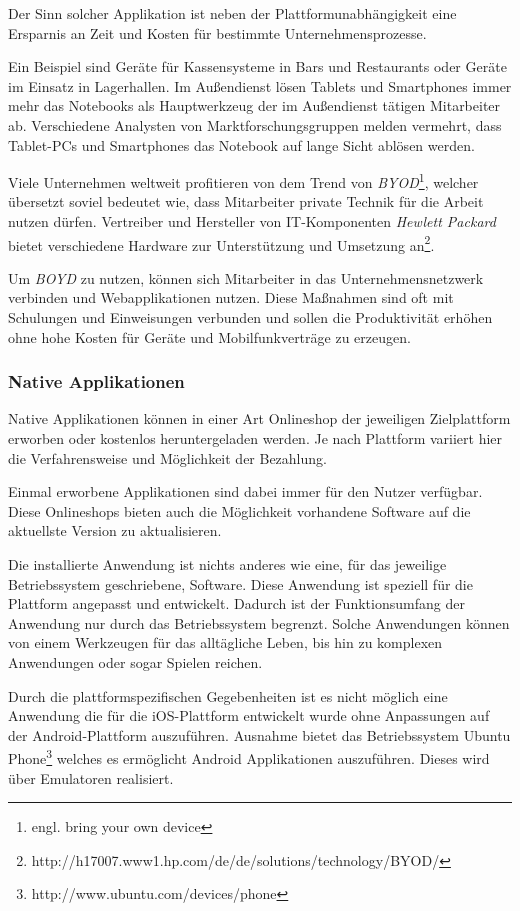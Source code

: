 Der Sinn solcher Applikation ist neben der Plattformunabhängigkeit eine Ersparnis an Zeit und Kosten für bestimmte Unternehmensprozesse.

Ein Beispiel sind Geräte für Kassensysteme in Bars und Restaurants oder Geräte im Einsatz in Lagerhallen. Im Außendienst lösen Tablets und Smartphones immer mehr das Notebooks als Hauptwerkzeug der im Außendienst tätigen Mitarbeiter ab. Verschiedene Analysten von Marktforschungsgruppen melden vermehrt, dass Tablet-PCs und Smartphones das Notebook auf lange Sicht ablösen werden\cite{blogpost_1}.

Viele Unternehmen weltweit\cite{news_1} profitieren von dem Trend von \textit{BYOD}\footnote{engl. bring your own device}, welcher übersetzt soviel bedeutet wie, dass Mitarbeiter private Technik für die Arbeit nutzen dürfen. Vertreiber und Hersteller von IT-Komponenten \emph{Hewlett Packard} bietet verschiedene Hardware zur Unterstützung und Umsetzung an\footnote{http://h17007.www1.hp.com/de/de/solutions/technology/BYOD/}.

 Um \textit{BOYD} zu nutzen, können sich Mitarbeiter in das Unternehmensnetzwerk verbinden und Webapplikationen nutzen. Diese Maßnahmen sind oft mit Schulungen und Einweisungen verbunden und sollen die Produktivität erhöhen ohne hohe Kosten für Geräte und Mobilfunkverträge zu erzeugen.

\subsubsection{Native Applikationen}
\label{natand}

Native Applikationen können in einer Art Onlineshop der jeweiligen Zielplattform erworben oder kostenlos heruntergeladen werden. Je nach Plattform variiert hier die Verfahrensweise und Möglichkeit der Bezahlung.

Einmal erworbene Applikationen sind dabei immer für den Nutzer verfügbar. Diese Onlineshops bieten auch die Möglichkeit vorhandene Software auf die aktuellste Version zu aktualisieren.

Die installierte Anwendung ist nichts anderes wie eine, für das jeweilige Betriebssystem geschriebene, Software. Diese Anwendung ist speziell für die Plattform angepasst und entwickelt. Dadurch ist der Funktionsumfang der Anwendung nur durch das Betriebssystem begrenzt. Solche Anwendungen können von einem Werkzeugen für das alltägliche Leben, bis hin zu komplexen Anwendungen oder sogar Spielen reichen.

Durch die plattformspezifischen Gegebenheiten ist es nicht möglich eine Anwendung die für die iOS-Plattform entwickelt wurde ohne Anpassungen auf der Android-Plattform auszuführen. Ausnahme bietet das Betriebssystem Ubuntu Phone\footnote{http://www.ubuntu.com/devices/phone} welches es ermöglicht Android Applikationen auszuführen. Dieses wird über Emulatoren realisiert. 

